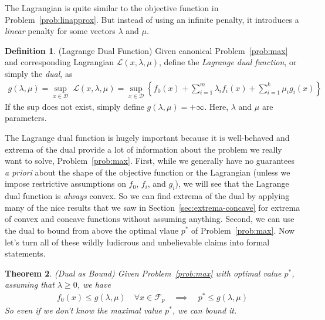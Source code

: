 \documentclass[12pt]{book}
\numberwithin{equation}{section} %
\theoremstyle{plain}
\newtheorem{thm}{Theorem}[section]
\theoremstyle{definition}
\newtheorem{defn}[thm]{Definition}
\theoremstyle{remark}
\newcommand{\sF}{\mathscr{F}}
\newcommand{\sL}{\mathscr{L}}
\begin{document}
The Lagrangian is quite similar to the objective function in
Problem~\ref{prob:linapprox}. But instead of using an infinite penalty,
it introduces a \emph{linear} penalty for some vectors $\lambda$ and
$\mu$.

\begin{defn}{(Lagrange Dual Function)}
Given canonical Problem~\ref{prob:max} and corresponding Lagrangian
$\sL(x,\lambda,\mu)$, define the \emph{Lagrange dual function}, or
simply the \emph{dual}, as
\begin{align*}
  g(\lambda,\mu) = \sup_{x\in\mathcal{D}} \; \sL(x,\lambda,\mu)
  = \sup_{x\in\mathcal{D}}
    \left\{ f_0(x)
    + \sum^m_{i=1} \lambda_i f_i(x)
    + \sum^k_{i=1} \mu_i g_i(x)
    \right\}
\end{align*}
If the sup does not exist, simply define $g(\lambda,\mu)=+\infty$.
Here, $\lambda$ and $\mu$ are parameters.
\end{defn}

The Lagrange dual function is hugely important because it is
well-behaved and extrema of the dual provide a lot of information about
the problem we really want to solve, Problem~\ref{prob:max}.  First,
while we generally have no guarantees \emph{a priori} about the shape of
the objective function or the Lagrangian (unless we impose restrictive
assumptions on $f_0$, $f_i$, and $g_i$), we will see that the Lagrange
dual function is \emph{always} convex. So we can find extrema of the
dual by applying many of the nice results that we saw in
Section~\ref{sec:extrema-concave} for extrema of convex and concave
functions without assuming anything. Second, we can use the dual to
bound from above the optimal vlaue $p^*$ of Problem~\ref{prob:max}.
Now let's turn all of these wildly ludicrous and unbelievable claims
into formal statements.

\begin{thm}{\emph{(Dual as Bound)}}
\label{thm:dual-bound}
Given Problem~\ref{prob:max} with optimal value $p^*$,
assuming that $\lambda\geq 0$, we have
\begin{align}
  f_0(x) \leq g(\lambda,\mu)
  \quad\forall x\in \sF_p
  \quad\implies\quad
  p^* \leq g(\lambda,\mu)
  \label{ineq:dual-bound}
\end{align}
So even if we don't know the maximal value $p^*$, we can bound it.
\end{thm}
\end{document}
